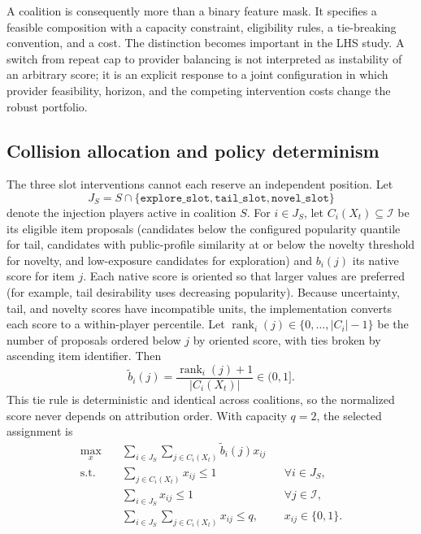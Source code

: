 \documentclass[review]{elsarticle}
\theoremstyle{plain}
\theoremstyle{definition}
\theoremstyle{remark}
\begin{document}
A coalition is consequently more than a binary feature mask. It specifies a feasible composition with a capacity constraint, eligibility rules, a tie-breaking convention, and a cost. The distinction becomes important in the LHS study. A switch from repeat cap to provider balancing is not interpreted as instability of an arbitrary score; it is an explicit response to a joint configuration in which provider feasibility, horizon, and the competing intervention costs change the robust portfolio.

\subsection{Collision allocation and policy determinism}

The three slot interventions cannot each reserve an independent position. Let
\begin{equation}
 J_S=S\cap\{\texttt{explore\_slot},\texttt{tail\_slot},\texttt{novel\_slot}\}
\label{eq:injection-set}
\end{equation}
denote the injection players active in coalition $S$. For $i\in J_S$, let $C_i(X_t)\subseteq\mathcal{I}$ be its eligible item proposals (candidates below the configured popularity quantile for tail, candidates with public-profile similarity at or below the novelty threshold for novelty, and low-exposure candidates for exploration) and $b_i(j)$ its native score for item $j$. Each native score is oriented so that larger values are preferred (for example, tail desirability uses decreasing popularity). Because uncertainty, tail, and novelty scores have incompatible units, the implementation converts each score to a within-player percentile. Let $\operatorname{rank}_i(j)\in\{0,\ldots,|C_i|-1\}$ be the number of proposals ordered below $j$ by oriented score, with ties broken by ascending item identifier. Then
\begin{equation}
 \widetilde b_i(j)=\frac{\operatorname{rank}_i(j)+1}{|C_i(X_t)|}\in(0,1].
\label{eq:percentile}
\end{equation}
This tie rule is deterministic and identical across coalitions, so the normalized score never depends on attribution order. With capacity $q=2$, the selected assignment is
\begin{equation}
 \begin{aligned}
 \max_{x}\quad &\sum_{i\in J_S}\sum_{j\in C_i(X_t)}\widetilde b_i(j)x_{ij}\\
 \text{s.t.}\quad
 &\sum_{j\in C_i(X_t)}x_{ij}\leq1 && \forall i\in J_S,\\
 &\sum_{i\in J_S}x_{ij}\leq1 && \forall j\in\mathcal I,\\
 &\sum_{i\in J_S}\sum_{j\in C_i(X_t)}x_{ij}\leq q,
 &&x_{ij}\in\{0,1\}.
 \end{aligned}
\label{eq:assignment}
\end{equation}
\end{document}
